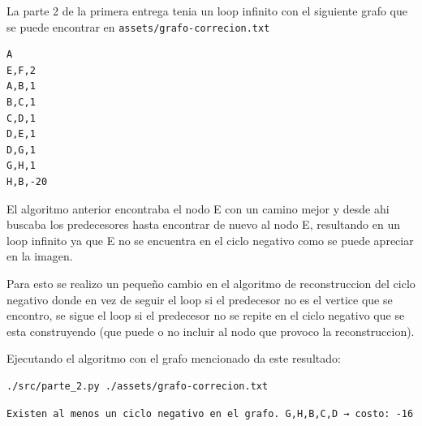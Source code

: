 \documentclass[titlepage,a4paper]{article}
\begin{document}
La parte 2 de la primera entrega tenia un loop infinito con el siguiente grafo
que se puede encontrar en \texttt{assets/grafo-correcion.txt}

\begin{verbatim}
A
E,F,2
A,B,1
B,C,1
C,D,1
D,E,1
D,G,1
G,H,1
H,B,-20
\end{verbatim}

\begin{center}

\end{center}

El algoritmo anterior encontraba el nodo E con un camino mejor y desde ahi
buscaba los predecesores hasta encontrar de nuevo al nodo E, resultando en un
loop infinito ya que E no se encuentra en el ciclo negativo como se puede
apreciar en la imagen.

Para esto se realizo un pequeño cambio en el algoritmo de reconstruccion del
ciclo negativo donde en vez de seguir el loop si el predecesor no es el vertice
que se encontro, se sigue el loop si el predecesor no se repite en el ciclo
negativo que se esta construyendo (que puede o no incluir al nodo que provoco la
reconstruccion).

Ejecutando el algoritmo con el grafo mencionado da este resultado:

\begin{verbatim}
./src/parte_2.py ./assets/grafo-correcion.txt
\end{verbatim}

\begin{verbatim}
Existen al menos un ciclo negativo en el grafo. G,H,B,C,D → costo: -16
\end{verbatim}
\end{document}
